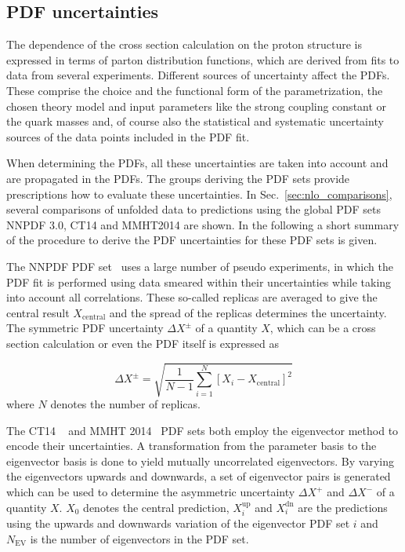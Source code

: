 \subsection{PDF uncertainties}
\label{sec:pdf_uncertainties}

The dependence of the cross section calculation on the proton structure is
expressed in terms of parton distribution functions, which are derived from fits
to data from several experiments. Different sources of uncertainty affect the
PDFs. These comprise the choice and the functional form of the parametrization,
the chosen theory model and input parameters like the strong coupling constant
\as or the quark masses and, of course also the statistical and systematic
uncertainty sources of the data points included in the PDF fit.

When determining the PDFs, all these uncertainties are taken into account and
are propagated in the PDFs. The groups deriving the PDF sets provide
prescriptions how to evaluate these uncertainties. In
Sec.~\ref{sec:nlo_comparisons}, several comparisons of unfolded data to
predictions using the global PDF sets NNPDF 3.0, CT14 and MMHT2014 are shown. In
the following a short summary of the procedure to derive the PDF uncertainties
for these PDF sets is given.

The NNPDF PDF set~\cite{Ball:2014uwa} uses a large number of pseudo experiments,
in which the PDF fit is performed using data smeared within their uncertainties
while taking into account all correlations. These so-called replicas are
averaged to give the central result $X_\mathrm{central}$ and the spread of the
replicas determines the uncertainty. The symmetric PDF uncertainty $\Delta
X^\pm$ of a quantity $X$, which can be a cross section calculation or even the
PDF itself is expressed as

\begin{equation*}
    \Delta X^{\pm} = \sqrt{\frac{1}{N-1} \sum_{i=1}^N \left[ X_{i} - X_{\mathrm{central}} \right]^2}
\end{equation*}
where $N$ denotes the number of replicas.

The CT14 ~\cite{Dulat:2015mca} and MMHT 2014~\cite{Harland-Lang:2014zoa} PDF
sets both employ the eigenvector method to encode their uncertainties. A
transformation from the parameter basis to the eigenvector basis is done to
yield mutually uncorrelated eigenvectors. By varying the eigenvectors upwards
and downwards, a set of eigenvector pairs is generated which can be used to
determine the asymmetric uncertainty $\Delta X^+$ and $\Delta X^-$ of a quantity
$X$. $X_0$ denotes the central prediction, $X_i^{\mathrm{up}}$ and
$X_i^{\mathrm{dn}}$ are the predictions using the upwards and downwards
variation of the eigenvector PDF set $i$ and $N_{\mathrm{EV}}$ is the number of
eigenvectors in the PDF set.

